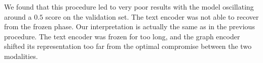\documentclass[switch, 12pt]{article}
\begin{document}
\begin{multicols}{2}
\begin{enumerate}
              We found that this procedure led to very poor results with the model oscillating around a $0.5$ score on the validation set. The text encoder was not able to recover from the frozen phase. Our interpretation is actually the same as in the previous procedure. The text encoder was frozen for too long, and the graph encoder shifted its representation too far from the optimal compromise between the two modalities.

    \end{enumerate}

    \newpage

    

\end{multicols}
\end{document}
